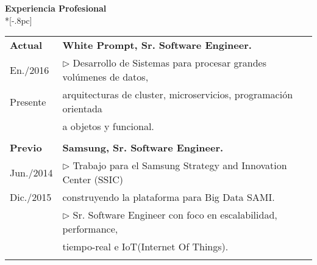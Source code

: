 \documentclass[a4paper,11pt,english]{article}
\begin{document}
{\large \bf Experiencia Profesional}\\*[-.8pc]
\underline{\hspace{6in}}
\\
\begin{tabular}{ p{2cm} l }

  {\bf Actual} & {\bf White Prompt, Sr. Software Engineer.}\\
   En./2016   & $\triangleright$ Desarrollo de Sistemas para procesar grandes vol\'umenes de datos, \\ 
   Presente    & arquitecturas de cluster, microservicios, programaci\'on orientada\\
                    & a objetos y funcional. \\
                
  \\

  {\bf Previo } & {\bf Samsung, Sr. Software Engineer.}\\
   Jun./2014   & $\triangleright$ Trabajo para el Samsung Strategy and Innovation Center (SSIC)\\
   Dic./2015     & construyendo la plataforma para Big Data SAMI.\\
                & $\triangleright$ Sr. Software Engineer con foco en escalabilidad, performance,\\
                & tiempo-real e IoT(Internet Of Things).\\ 
  \\
                

\end{tabular}
\end{document}
